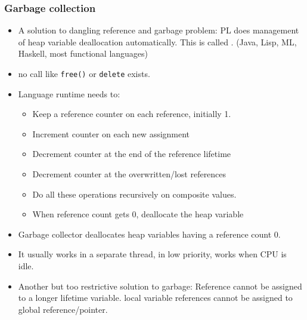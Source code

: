 \begin{frame}
 \frametitle{Garbage collection}
 \begin{itemize}
  \item A solution to dangling reference and garbage problem: PL does management of heap variable deallocation automatically. This is called . (Java, Lisp, ML, Haskell, most functional languages)
  \item no call like \texttt{free()} or \texttt{delete} exists.
  \item Language runtime needs to:
	\begin{itemize}
		\item Keep a reference counter on each reference, initially 1.
		\item Increment counter on each new assignment
		\item Decrement counter at the end of the reference lifetime
		\item Decrement counter at the overwritten/lost references
		\item Do all these operations recursively on composite values.
		\item When reference count gets 0, deallocate the heap variable
	\end{itemize}
  \end{itemize}
 \end{frame}

\begin{frame}
 \begin{itemize}
  \item Garbage collector deallocates heap variables having a reference count 0.
  \item It usually works in a separate thread, in low priority, works when CPU is idle.
  \item Another but too restrictive solution to garbage: Reference cannot be assigned to a longer lifetime variable.
	local variable references cannot be assigned to global reference/pointer.
 \end{itemize}
\end{frame}

